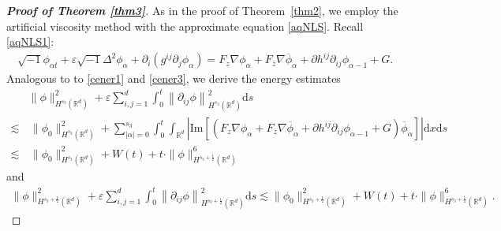 \documentclass[10pt,twoside,a4paper]{article}
\numberwithin{equation}{section}\allowdisplaybreaks
\begin{document}
\begin{proof}[\textbf{Proof of Theorem \ref{thm3}}]
As in the proof of Theorem~\ref{thm2}, we employ the artificial viscosity method with the approximate equation \eqref{aqNLS}. Recall \eqref{aqNLS1}:
	\begin{align*}  
		\sqrt{-1}\phi_{\alpha t}+	\varepsilon\sqrt{-1}\Delta^2 \phi_\alpha+\partial_i\left( g^{ij} \partial_j \phi_{\alpha }\right)=F_z\nabla \phi_\alpha+F_{\overline{z}}\nabla \overline{\phi}_\alpha+\partial h^{ij}\partial_{ij } \phi_{\alpha -1}+G.
	\end{align*}
Analogous to to \eqref{cener1} and \eqref{cener3},
we derive the energy estimates
	\begin{align*}
		&	\| \phi\|_{H^{s_3 }(\mathbb{R}^d)}^2+\varepsilon  \sum_{i,j=1}^d\int_0^t\left\| \partial_{ij}\phi\right\|_{H^{s_3}(\mathbb{R}^d)}^2 \mathrm{d} s\\
		\lesssim &\, 		\| \phi_0\|_{H^{s_3 }(\mathbb{R}^d)}^2+\sum_{|\alpha|=0}^{s_3}\int_0^t\int_{\mathbb{R}^d} \left| \mathrm{Im} \left[  \left(F_z\nabla \phi_\alpha+F_{\overline{z}}\nabla \overline{\phi}_\alpha+\partial h^{ij}\partial_{ij } \phi_{\alpha -1}+G\right)\overline{\phi}_{\alpha }\right]\right| \mathrm{d} x\mathrm{d} s\\
		\lesssim &\,\| \phi_0\|_{H^{s_3 }(\mathbb{R}^d)}^2+W(t)+t\cdot\|\phi\|_{H^{s_3+\frac12}(\mathbb{R}^{d})}^6 \nonumber
	\end{align*}
	and 
	\begin{align} \label{acener3}
		\|\phi\|_{H^{s_3+\frac12}(\mathbb{R}^{d})}^2+\varepsilon  \sum_{i,j=1}^d\int_0^t\left\| \partial_{ij}\phi\right\|_{H^{s_3+\frac 12}(\mathbb{R}^d)}^2 \mathrm{d} s\lesssim 	\|\phi_0\|_{H^{s_3+\frac12}(\mathbb{R}^{d})}^2+ W(t)+t\cdot\|\phi\|_{H^{s_3+\frac12}(\mathbb{R}^{d})}^6.
	\end{align}
	
	
	

\end{proof}
\end{document}
